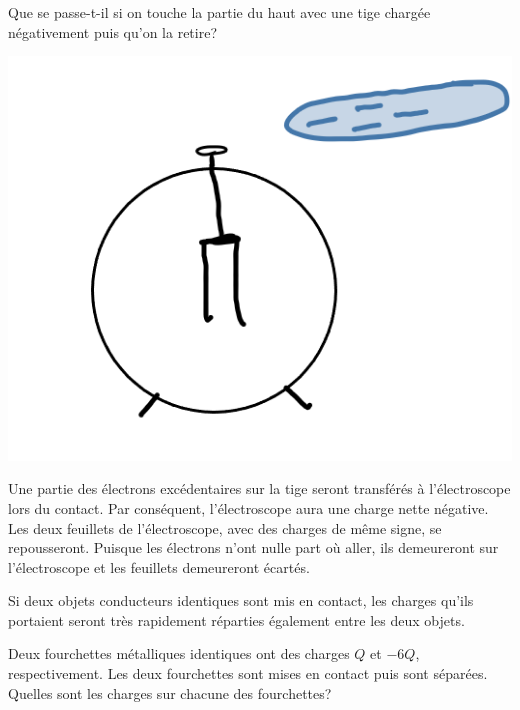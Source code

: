 \begin{diapobox}
  Que se passe-t-il si on touche la partie du haut avec une tige chargée
  négativement puis qu'on la retire?
  \begin{center}
    \includegraphics[scale=0.3]{01-force-electrique/figures/electroscope.png}
  \end{center}
\end{diapobox}
\begin{reponsebox}
  Une partie des électrons excédentaires sur la tige seront transférés à
  l'électroscope lors du contact. Par conséquent, l'électroscope aura une
  charge nette négative. Les deux feuillets de l'électroscope, avec des charges
  de même signe, se repousseront. Puisque les électrons n'ont nulle part où
  aller, ils demeureront sur l'électroscope et les feuillets demeureront
  écartés.
\end{reponsebox}


Si deux objets conducteurs identiques sont mis en contact, les charges qu'ils
portaient seront très rapidement réparties également entre les deux objets.

\begin{diapobox}
  Deux fourchettes métalliques identiques ont des charges $Q$ et $-6Q$,
  respectivement. Les deux fourchettes sont mises en contact puis sont
  séparées.  Quelles sont les charges sur chacune des fourchettes?
\end{diapobox}

